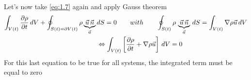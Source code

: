 	Let's now take \autoref{eq:1.7} again and apply Gauss theorem
	\begin{equation}
	\begin{aligned}
		\int _{V(t)} \frac{\D \rho}{\D t}\, dV + \oint _{S(t) = \D V(t)} \rho \underbrace{\vec{u}\, \vec{n}}_{\vec{a}}\, &dS =0 \qquad with \qquad 
		\oint _{S(t)} \rho\, \underbrace{\vec{u}\, \vec{n}}_{\vec{a}}\, dS = \int _{V(t)} \nabla \rho \vec{u} \, dV \\
		&\Leftrightarrow \int _{V(t)} \left[ \frac{\D \rho}{\D t} + \nabla \rho \vec{u} \right] \,dV = 0
		\end{aligned}
	\end{equation}
	For this last equation to be true for all systems, the integrated term must be equal to zero 
	\begin{center}
	\end{center}
	
